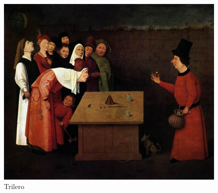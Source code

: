 \begin{figure}[h]
    \begin{minipage}{.3\textwidth}
        \centering
        \includegraphics[width=\linewidth]{./imagenes/trilero.jpg}
        \caption{Trilero}
    \end{minipage}
\end{figure}




